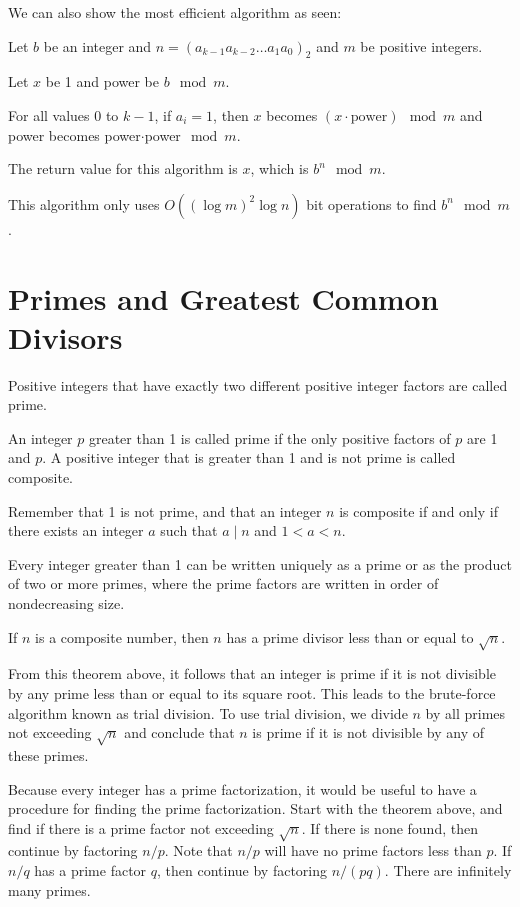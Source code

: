 \documentclass[../discrete.tex]{subfiles}
\begin{document}
We can also show the most efficient algorithm as seen:

Let $b$ be an integer and $n = (a_{k-1}a_{k-2}\dots a_1a_0)_2$ and $m$ be positive integers.

Let $x$ be 1 and power be $b\mod m$.

For all values 0 to $k-1$, if $a_i = 1$, then $x$ becomes $(x\cdot \text{power})\mod m$ and power becomes power$\cdot$power$\mod m$.

The return value for this algorithm is $x$, which is $b^n \mod m$.

This algorithm only uses $O((\log m)^2\log n)$ bit operations to find $b^n\mod m$.
\section{Primes and Greatest Common Divisors}
Positive integers that have exactly two different positive integer factors are called prime.

\begin{definition}
    An integer $p$ greater than 1 is called prime if the only positive factors of $p$ are 1 and $p$. A positive integer that is greater than 1 and is not prime is called composite.
\end{definition}

Remember that 1 is not prime, and that an integer $n$ is composite if and only if there exists an integer $a$ such that $a\mid n$ and $1<a<n$.

\begin{theorem}
    Every integer greater than 1 can be written uniquely as a prime or as the product of two or more primes, where the prime factors are written in order of nondecreasing size.
\end{theorem}

\begin{theorem}
    If $n$ is a composite number, then $n$ has a prime divisor less than or equal to $\sqrt{n}$.
\end{theorem}

From this theorem above, it follows that an integer is prime if it is not divisible by any prime less than or equal to its square root.
This leads to the brute-force algorithm known as trial division. To use trial division, we divide $n$ by all primes not exceeding
$\sqrt{n}$ and conclude that $n$ is prime if it is not divisible by any of these primes.

Because every integer has a prime factorization, it would be useful to have a procedure for finding the prime factorization. 
Start with the theorem above, and find if there is a prime factor not exceeding $\sqrt{n}$. If there is none found, then continue 
by factoring $n/p$. Note that $n/p$ will have no prime factors less than $p$. If $n/q$ has a prime factor $q$, then continue by factoring $n/(pq)$. There are infinitely many primes.
\end{document}
